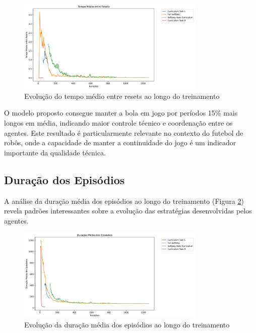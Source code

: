 \begin{figure}[H]
    \centering
    \includegraphics[width=0.8\textwidth]{fig/graficos_trabalho/graficos_experimentos/geral/custom_metricsavg_time_between_resets_mean.png}
    \caption{Evolução do tempo médio entre resets ao longo do treinamento}
    \label{fig:time_between_resets}
\end{figure}

O modelo proposto consegue manter a bola em jogo por períodos 15\% mais longos em média, indicando maior controle técnico e coordenação entre os agentes. Este resultado é particularmente relevante no contexto do futebol de robôs, onde a capacidade de manter a continuidade do jogo é um indicador importante da qualidade técnica.

\subsection{Duração dos Episódios}

A análise da duração média dos episódios ao longo do treinamento (Figura \ref{fig:episode_len}) revela padrões interessantes sobre a evolução das estratégias desenvolvidas pelos agentes.

\begin{figure}[H]
    \centering
    \includegraphics[width=0.8\textwidth]{fig/graficos_trabalho/graficos_experimentos/geral/episode_len_mean.png}
    \caption{Evolução da duração média dos episódios ao longo do treinamento}
    \label{fig:episode_len}
\end{figure}

